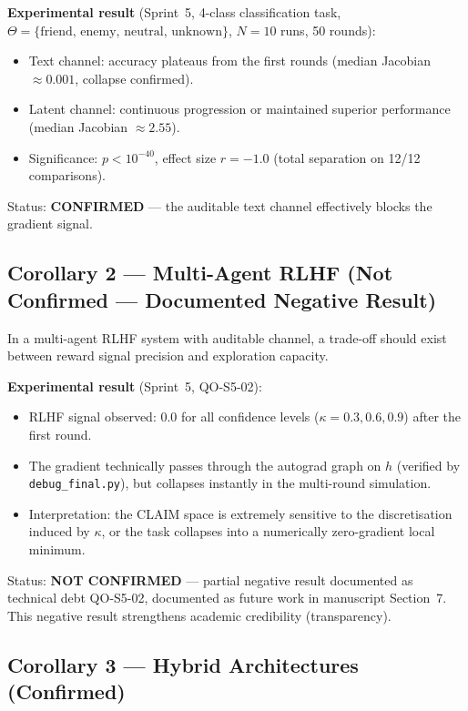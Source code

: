 \documentclass[11pt,a4paper]{article}
\theoremstyle{plain}
\begin{document}
\begin{validated}
\textbf{Experimental result} (Sprint~5, 4-class classification task,
$\Theta = \{\text{friend, enemy, neutral, unknown}\}$, $N=10$ runs, 50 rounds):
\begin{itemize}[noitemsep]
\item Text channel: accuracy plateaus from the first rounds (median Jacobian $\approx 0.001$, collapse confirmed).
\item Latent channel: continuous progression or maintained superior performance (median Jacobian $\approx 2.55$).
\item Significance: $p < 10^{-40}$, effect size $r = -1.0$ (total separation on 12/12 comparisons).
\end{itemize}
Status: \textbf{CONFIRMED} --- the auditable text channel effectively blocks the gradient signal.
\end{validated}

\subsection{Corollary 2 --- Multi-Agent RLHF (Not Confirmed --- Documented Negative Result)}

In a multi-agent RLHF system with auditable channel, a trade-off should exist
between reward signal precision and exploration capacity.

\begin{partial}
\textbf{Experimental result} (Sprint~5, QO-S5-02):
\begin{itemize}[noitemsep]
\item RLHF signal observed: 0.0 for all confidence levels ($\kappa = 0.3, 0.6, 0.9$) after the first round.
\item The gradient technically passes through the autograd graph on $h$ (verified by \texttt{debug\_final.py}), but collapses instantly in the multi-round simulation.
\item Interpretation: the CLAIM space is extremely sensitive to the discretisation induced by $\kappa$, or the task collapses into a numerically zero-gradient local minimum.
\end{itemize}
Status: \textbf{NOT CONFIRMED} --- partial negative result documented as technical debt QO-S5-02, documented as future work in manuscript Section~7. This negative result strengthens academic credibility (transparency).
\end{partial}

\subsection{Corollary 3 --- Hybrid Architectures (Confirmed)}
\end{document}
